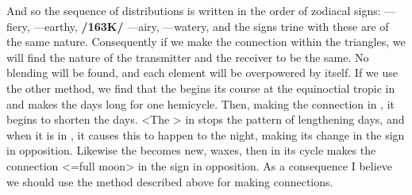And so the sequence of distributions is written in the order of zodiacal signs: \Aries—fiery, \Taurus—earthy, \textbf{/163K/} \Gemini—airy, \Cancer—watery, and the signs trine with these are of the same nature. Consequently if we make the connection within the triangles, we will find the nature of the transmitter and the receiver to be the same. No blending will be found, and each element will be overpowered by itself. If we use the other method, we find that the \Sun\xspace begins its course at the equinoctial tropic in \Aries\xspace and makes the days long for one hemicycle. Then, making the connection in \Libra, it begins to shorten the days. <The \Sun> in \Cancer\xspace stops the pattern of lengthening days, and when it is in \Capricorn, it causes this to happen to the night, making its change in the sign in opposition. Likewise the \Moon\xspace becomes new, waxes, then in its cycle makes the connection <=full moon> in the sign in opposition. As a
consequence I believe we should use the method described above for making connections.


\newpage